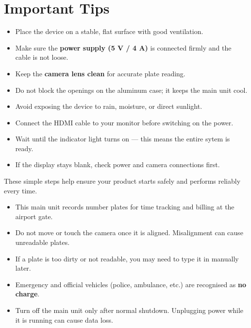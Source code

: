 \vspace{0.8em}

\section*{Important Tips}

\begin{itemize}
	\item Place the device on a stable, flat surface with good ventilation.
	\item Make sure the \textbf{power supply (5 V / 4 A)} is connected firmly and the cable is not loose.
	\item Keep the \textbf{camera lens clean} for accurate plate reading.
	\item Do not block the openings on the aluminum case; it keeps the main unit cool.
	\item Avoid exposing the device to rain, moisture, or direct sunlight.
	\item Connect the HDMI cable to your monitor before switching on the power.
	\item Wait until the indicator light turns on — this means the entire sytem is ready.
	\item If the display stays blank, check power and camera connections first.
\end{itemize}

\vspace{0.5em}
\noindent
These simple steps help ensure your product starts safely and performs reliably every time.

\vspace{0.8cm}

\begin{tcolorbox}[
	colback=yellow!10,
	colframe=yellow!50!black,
	title={Important to Know Before Use},
	fonttitle=\bfseries,
	left=6pt,
	right=6pt,
	top=6pt,
	bottom=6pt,
	boxrule=0.8pt
	]
	\begin{itemize}
		\item This  main unit records number plates for time tracking and billing at the airport gate.
		\item Do not move or touch the camera once it is aligned. Misalignment can cause unreadable plates.
		\item If a plate is too dirty or not readable, you may need to type it in manually later.
		\item Emergency and official vehicles (police, ambulance, etc.) are recognised as \textbf{no charge}.
		\item Turn off the main unit only after normal shutdown. Unplugging power while it is running can cause data loss.
	\end{itemize}
\end{tcolorbox}

%
%
